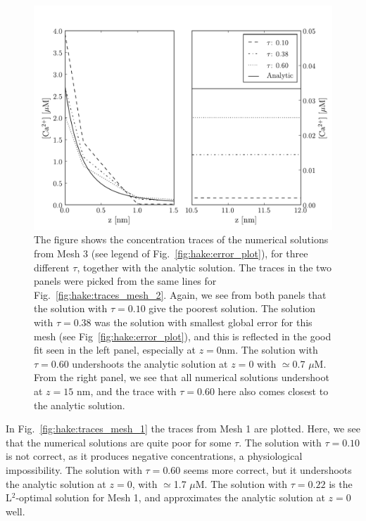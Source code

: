 \begin{figure}
  \label{fig:hake:traces_mesh_3}
  \centering
    \includegraphics[width=\largefig]{chapters/hake/pdf/traces_mesh_3}
    \caption[Concentration traces 3]{The figure shows the
      concentration traces of the numerical solutions from Mesh 3 (see
      legend of Fig.~\ref{fig:hake:error_plot}), for three different
      $\tau$, together with the analytic solution. The traces in the
      two panels were picked from the same lines for
      Fig.~\ref{fig:hake:traces_mesh_2}. Again, we see from both
      panels that the solution with $\tau=0.10$ give the poorest
      solution. The solution with $\tau=0.38$ was the solution with
      smallest global error for this mesh (see
      Fig~\ref{fig:hake:error_plot}), and this is reflected in the
      good fit seen in the left panel, especially at $z=0$nm. The
      solution with $\tau=0.60$ undershoots the analytic solution at
      $z=0$ with $\simeq$0.7 $\mu$M. From the right panel, we see that
      all numerical solutions undershoot at $z=15$ nm, and the trace
      with $\tau=0.60$ here also comes closest to the analytic
      solution.}
\end{figure}

In Fig.~\ref{fig:hake:traces_mesh_1} the traces from Mesh 1 are
plotted. Here, we see that the numerical solutions are quite poor for
some $\tau$. The solution with $\tau=0.10$ is not correct, as it
produces negative concentrations, a physiological impossibility. The
solution with $\tau=0.60$ seems more correct, but it undershoots the
analytic solution at $z=0$, with $\simeq$1.7 $\mu$M. The solution with
$\tau=0.22$ is the L$^2$-optimal solution for Mesh 1, and approximates
the analytic solution at $z=0$ well.\par

